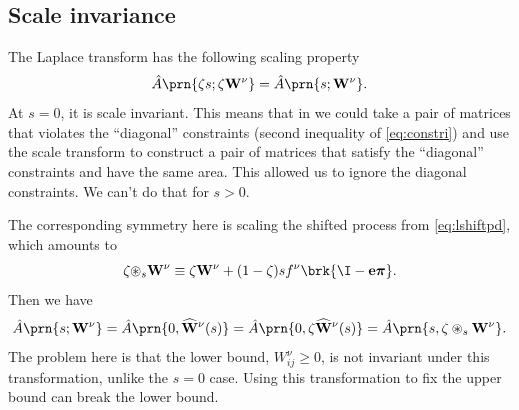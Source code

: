 \documentclass[12pt]{article}
\newcommand{\onev}{\mathbf{e}}
\newcommand{\eqm}{\pi}
\newcommand{\eq}{\boldsymbol{\eqm}}
\newcommand{\Wm}{W}
\newcommand{\W}{\mathbf{\Wm}}
\newcommand{\MMdm}{M}
\newcommand{\MMd}{\mathbf{\MMdm}}
\newcommand{\shift}[1]{\widehat{#1}}
\begin{document}

\subsection{Scale invariance}\label{sec:scale}

The Laplace transform has the following scaling property
%
\begin{equation}\label{eq:laplacescale}
  \hat{A} \prn{\zeta s;\zeta \W^\nu} = \hat{A} \prn{s; \W^\nu}.
\end{equation}
%
At \(s = 0\), it is scale invariant.
This means that in \cite{Lahiri2013synapse} we could take a pair of matrices that violates the ``diagonal'' constraints (second inequality of \cref{eq:constri}) and use the scale transform to construct a pair of matrices that satisfy the ``diagonal'' constraints and have the same area.
This allowed us to ignore the diagonal constraints.
We can't do that for \(s > 0\).

The corresponding symmetry here is scaling the shifted process from \cref{eq:lshiftpd}, which amounts to
%
\begin{equation}\label{eq:shiftscale}
  \zeta {\circledast}_{s} \W^\nu
      \equiv \zeta \W^\nu
      + (1 - \zeta) s f^\nu \brk{\I - \onev \eq} .
\end{equation}
%
Then we have
%
\begin{equation}\label{eq:lshiftscale}
  \hat{A} \prn{s; \W^\nu} 
    = \hat{A} \prn{0, \shift{\W}^\nu(s)}
    = \hat{A} \prn{0, \zeta \shift{\W}^\nu(s)}
    = \hat{A} \prn{s, \zeta \circledast_s \W^\nu}.
\end{equation}
%
The problem here is that the lower bound, \(\Wm^\nu_{ij} \geq 0\), 
is not invariant under this transformation, unlike the \(s = 0\) case.
Using this transformation to fix the upper bound can break the lower bound.
\end{document}
